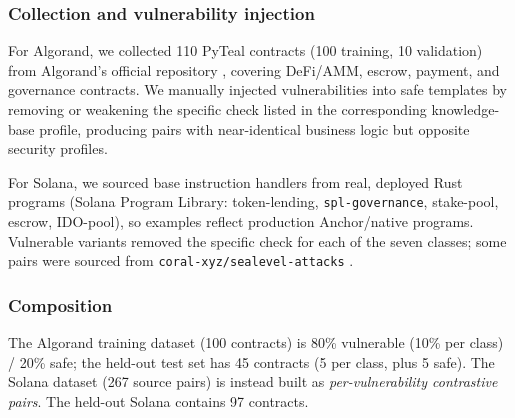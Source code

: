 \documentclass[lettersize,journal]{IEEEtran}
\begin{document}
\subsubsection{Collection and vulnerability injection}
For Algorand, we collected 110 PyTeal contracts (100 training, 10 validation) from Algorand's
official repository \cite{algorand_pyteal_github}, covering DeFi/AMM, escrow, payment, and
governance contracts. We manually injected vulnerabilities into safe templates by removing or
weakening the specific check listed in the corresponding knowledge-base profile, producing pairs
with near-identical business logic but opposite security profiles.

For Solana, we sourced base instruction handlers from real, deployed Rust programs (Solana Program
Library: token-lending, \texttt{spl-governance}, stake-pool, escrow, IDO-pool), so examples 
reflect production Anchor/native programs. Vulnerable variants removed the
specific check for each of the seven classes; some pairs were sourced from
\texttt{coral-xyz/sealevel-attacks} \cite{sealevel_attacks}.

\subsubsection{Composition}
The Algorand training dataset (100 contracts) is 80\% vulnerable (10\% per class) / 20\% safe; the
held-out test set has 45 contracts (5 per class, plus 5 safe). The Solana dataset (267 source pairs)
is instead built as \emph{per-vulnerability contrastive pairs}. The held-out Solana contains 97 contracts. 
\end{document}
